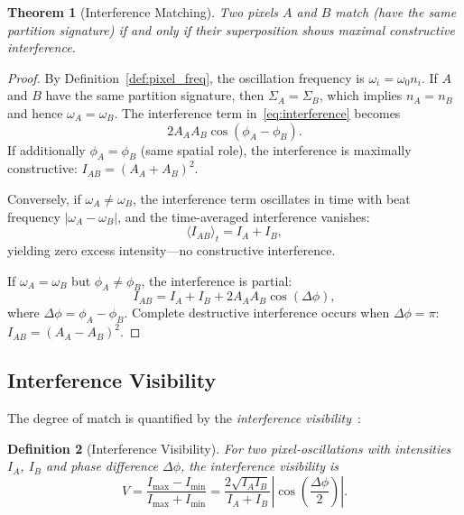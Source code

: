 \documentclass[11pt,twocolumn,a4paper]{article}
\newtheorem{theorem}{Theorem}[section]
\newtheorem{definition}[theorem]{Definition}
\begin{document}
\begin{theorem}[Interference Matching]\label{thm:interference_matching}
Two pixels $A$ and $B$ match (have the same partition signature) if and only if their superposition shows maximal constructive interference.
\end{theorem}

\begin{proof}
By Definition~\ref{def:pixel_freq}, the oscillation frequency is $\omega_i = \omega_0 n_i$. If $A$ and $B$ have the same partition signature, then $\Sigma_A = \Sigma_B$, which implies $n_A = n_B$ and hence $\omega_A = \omega_B$. The interference term in~\eqref{eq:interference} becomes
\begin{equation}
    2 A_A A_B \cos(\phi_A - \phi_B).
\end{equation}
If additionally $\phi_A = \phi_B$ (same spatial role), the interference is maximally constructive: $I_{AB} = (A_A + A_B)^2$.

Conversely, if $\omega_A \neq \omega_B$, the interference term oscillates in time with beat frequency $|\omega_A - \omega_B|$, and the time-averaged interference vanishes:
\begin{equation}
    \langle I_{AB} \rangle_t = I_A + I_B,
\end{equation}
yielding zero excess intensity---no constructive interference.

If $\omega_A = \omega_B$ but $\phi_A \neq \phi_B$, the interference is partial:
\begin{equation}
    I_{AB} = I_A + I_B + 2A_A A_B \cos(\Delta\phi),
\end{equation}
where $\Delta\phi = \phi_A - \phi_B$. Complete destructive interference occurs when $\Delta\phi = \pi$: $I_{AB} = (A_A - A_B)^2$.
\end{proof}

\subsection{Interference Visibility}

The degree of match is quantified by the \emph{interference visibility}~\citep{michelson1891, zernike1938}:

\begin{definition}[Interference Visibility]\label{def:visibility}
For two pixel-oscillations with intensities $I_A$, $I_B$ and phase difference $\Delta\phi$, the interference visibility is
\begin{equation}
    V = \frac{I_{\max} - I_{\min}}{I_{\max} + I_{\min}} = \frac{2\sqrt{I_A I_B}}{I_A + I_B} \left| \cos\!\left(\frac{\Delta\phi}{2}\right) \right|.
    \label{eq:visibility}
\end{equation}
\end{definition}
\end{document}
